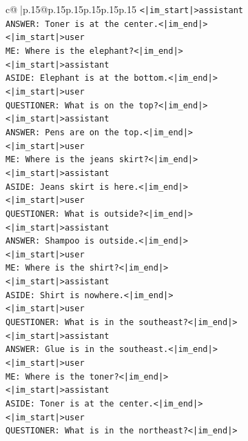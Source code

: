 \documentclass{article}
\begin{document}
{\begin{supertabular}{c@{$\;$}|p{.15\linewidth}@{}p{.15\linewidth}p{.15\linewidth}p{.15\linewidth}p{.15\linewidth}p{.15\linewidth}}
{{{\texttt{<|im\_start|>assistant} \\
\texttt{ANSWER: Toner is at the center.<|im\_end|>} \\
\texttt{<|im\_start|>user} \\
\texttt{ME: Where is the elephant?<|im\_end|>} \\
\texttt{<|im\_start|>assistant} \\
\texttt{ASIDE: Elephant is at the bottom.<|im\_end|>} \\
\texttt{<|im\_start|>user} \\
\texttt{QUESTIONER: What is on the top?<|im\_end|>} \\
\texttt{<|im\_start|>assistant} \\
\texttt{ANSWER: Pens are on the top.<|im\_end|>} \\
\texttt{<|im\_start|>user} \\
\texttt{ME: Where is the jeans skirt?<|im\_end|>} \\
\texttt{<|im\_start|>assistant} \\
\texttt{ASIDE: Jeans skirt is here.<|im\_end|>} \\
\texttt{<|im\_start|>user} \\
\texttt{QUESTIONER: What is outside?<|im\_end|>} \\
\texttt{<|im\_start|>assistant} \\
\texttt{ANSWER: Shampoo is outside.<|im\_end|>} \\
\texttt{<|im\_start|>user} \\
\texttt{ME: Where is the shirt?<|im\_end|>} \\
\texttt{<|im\_start|>assistant} \\
\texttt{ASIDE: Shirt is nowhere.<|im\_end|>} \\
\texttt{<|im\_start|>user} \\
\texttt{QUESTIONER: What is in the southeast?<|im\_end|>} \\
\texttt{<|im\_start|>assistant} \\
\texttt{ANSWER: Glue is in the southeast.<|im\_end|>} \\
\texttt{<|im\_start|>user} \\
\texttt{ME: Where is the toner?<|im\_end|>} \\
\texttt{<|im\_start|>assistant} \\
\texttt{ASIDE: Toner is at the center.<|im\_end|>} \\
\texttt{<|im\_start|>user} \\
\texttt{QUESTIONER: What is in the northeast?<|im\_end|>} \\
}}}
\end{supertabular}}
\end{document}
